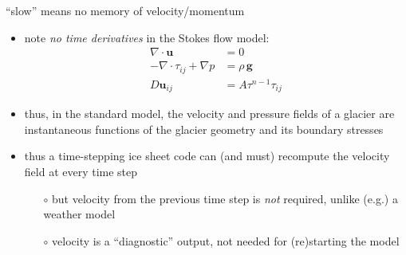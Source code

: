\documentclass[10pt,dvipsnames]{beamer}
\begin{document}
\begin{frame}{``slow'' means no memory of velocity/momentum}

\begin{itemize}
\item note \emph{no time derivatives} in the Stokes flow model:
\begin{align*}
\nabla \cdot \mathbf{u} &= 0 \\
-\nabla \cdot \tau_{ij} + \nabla p &= \rho\, \bm{g} \\
D\mathbf{u}_{ij} &= A \tau^{n-1} \tau_{ij}
\end{align*}
\item thus, in the standard model, the velocity and pressure fields of a glacier are \alert{instantaneous functions} of the glacier geometry and its boundary stresses
\item thus a time-stepping ice sheet code can (and must) recompute the velocity field at every time step
  \begin{itemize}
  \item[$\circ$] but velocity from the previous time step is \emph{not} required, unlike (e.g.) a weather model
  \item[$\circ$] velocity is a ``diagnostic'' output, not needed for (re)starting the model
  \end{itemize}
\end{itemize}
\end{frame}
\end{document}
